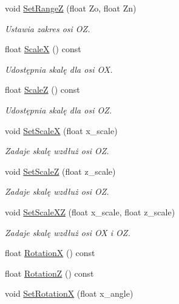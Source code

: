 \begin{DoxyCompactItemize}
void \hyperlink{class_pz_g_1_1_gnuplot_link_a6cb4123fb2cbe459a747c2a1c1f94770}{Set\+RangeZ} (float Zo, float Zn)
\begin{DoxyCompactList}\small\item\em Ustawia zakres osi {\itshape OZ}. \end{DoxyCompactList}\item 
float \hyperlink{class_pz_g_1_1_gnuplot_link_a60f11dbb42e3f8704572b1837236ee3f}{ScaleX} () const 
\begin{DoxyCompactList}\small\item\em Udostępnia skalę dla osi {\itshape OX}. \end{DoxyCompactList}\item 
float \hyperlink{class_pz_g_1_1_gnuplot_link_ab8a72e0e53ef198cba596f6c895b30cf}{ScaleZ} () const 
\begin{DoxyCompactList}\small\item\em Udostępnia skalę dla osi {\itshape OZ}. \end{DoxyCompactList}\item 
void \hyperlink{class_pz_g_1_1_gnuplot_link_a70d30fdb78dad112f96963a55f69e279}{Set\+ScaleX} (float x\+\_\+scale)
\begin{DoxyCompactList}\small\item\em Zadaje skalę wzdłuż osi {\itshape OZ}. \end{DoxyCompactList}\item 
void \hyperlink{class_pz_g_1_1_gnuplot_link_adb266ff0cb6bc916dcb12b6bd168ba14}{Set\+ScaleZ} (float z\+\_\+scale)
\begin{DoxyCompactList}\small\item\em Zadaje skalę wzdłuż osi {\itshape OZ}. \end{DoxyCompactList}\item 
void \hyperlink{class_pz_g_1_1_gnuplot_link_a922cef9903317477051890311f6f4dec}{Set\+Scale\+XZ} (float x\+\_\+scale, float z\+\_\+scale)
\begin{DoxyCompactList}\small\item\em Zadaje skalę wzdłuż osi {\itshape OX} i {\itshape OZ}. \end{DoxyCompactList}\item 
float \hyperlink{class_pz_g_1_1_gnuplot_link_a5af6158903c5defc05e96318af4ff8ce}{RotationX} () const 
\item 
float \hyperlink{class_pz_g_1_1_gnuplot_link_ac7601ea2c0af006013790b325781fb7c}{RotationZ} () const 
\item 
void \hyperlink{class_pz_g_1_1_gnuplot_link_ace414a178fc745111344ce2390e363b7}{Set\+RotationX} (float x\+\_\+angle)

\end{DoxyCompactItemize}
